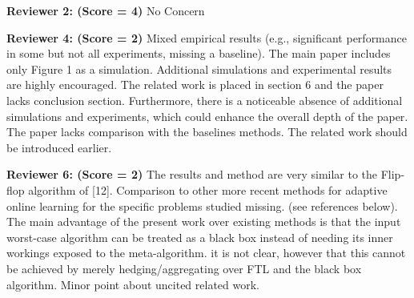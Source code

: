\documentclass{article}
\begin{document}
{\bf Reviewer 2: (Score = 4)} No Concern 

{\bf Reviewer 4: (Score = 2)} Mixed empirical results (e.g., significant performance in some but not all experiments, missing a baseline). The main paper includes only Figure 1 as a simulation. Additional simulations and experimental results are highly encouraged. The related work is placed in section 6 and the paper lacks conclusion section. Furthermore, there is a noticeable absence of additional simulations and experiments, which could enhance the overall depth of the paper. The paper lacks comparison with the baselines methods. The related work should be introduced earlier.


{\bf Reviewer 6: (Score = 2)} The results and method are very similar to the Flip-flop algorithm of [12]. Comparison to other more recent methods for adaptive online learning for the specific problems studied missing. (see references below). The main advantage of the present work over existing methods is that the input worst-case algorithm can be treated as a black box instead of needing its inner workings exposed to the meta-algorithm. it is not clear, however that this cannot be achieved by merely hedging/aggregating over FTL and the black box algorithm. Minor point about uncited related work. 
\end{document}
